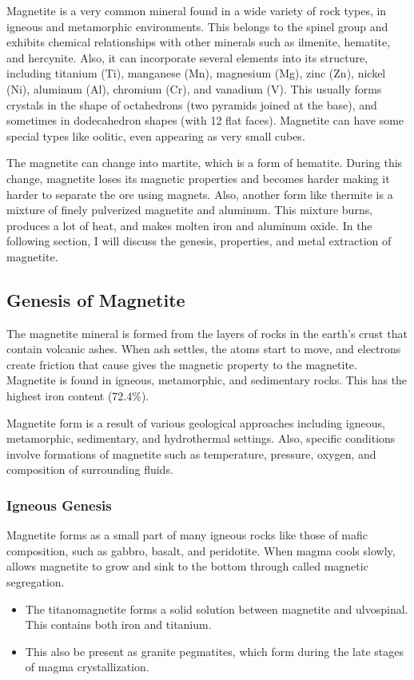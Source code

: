\documentclass[12pt,a4paper, top=1.9cm, bottom=2.03cm, left=3.81cm, right=1.9cm]{article}
\begin{document}
\noindent\fontsize{12}{14}\selectfont Magnetite is a very common mineral found in a wide variety of rock types, in igneous and metamorphic environments. This belongs to the spinel group and exhibits chemical relationships with other minerals such as ilmenite, hematite, and hercynite. Also, it can incorporate several elements into its structure, including titanium (Ti), manganese (Mn), magnesium (Mg), zinc (Zn), nickel (Ni), aluminum (Al), chromium (Cr), and vanadium (V). This usually forms crystals in the shape of octahedrons (two pyramids joined at the base), and sometimes in dodecahedron shapes (with 12 flat faces). Magnetite can have some special types like oolitic, even appearing as very small cubes.

\vspace{1cm}
\noindent\fontsize{12}{14}\selectfont The magnetite can change into martite, which is a form of hematite. During this change, magnetite loses its magnetic properties and becomes harder making it harder to separate the ore using magnets. Also, another form like thermite is a mixture of finely pulverized magnetite and aluminum. This mixture burns, produces a lot of heat, and makes molten iron and aluminum oxide. In the following section, I will discuss the genesis, properties, and metal extraction of magnetite.
\newpage
\subsection{Genesis of Magnetite}
\noindent\fontsize{12}{14}\selectfont The magnetite mineral is formed from the layers of rocks in the earth’s crust that contain volcanic ashes. When ash settles, the atoms start to move, and electrons create friction that cause gives the magnetic property to the magnetite. Magnetite is found in igneous, metamorphic, and sedimentary rocks. This has the highest iron content (72.4\%). 

\noindent\fontsize{12}{14}\selectfont Magnetite form is a result of various geological approaches including igneous, metamorphic, sedimentary, and hydrothermal settings. Also, specific conditions involve formations of magnetite such as temperature, pressure, oxygen, and composition of surrounding fluids. 
\subsubsection{Igneous Genesis}
\noindent\fontsize{12}{14}\selectfont Magnetite forms as a small part of many igneous rocks like those of mafic composition, such as gabbro, basalt, and peridotite. When magma cools slowly, allows magnetite to grow and sink to the bottom through called magnetic segregation.
\begin{itemize}[label=\textbullet]  %
\item The titanomagnetite forms a solid solution between magnetite and ulvospinal. This contains both iron and titanium.
\item This also be present as granite pegmatites, which form during the late stages of magma crystallization.
\end{itemize}
\end{document}
